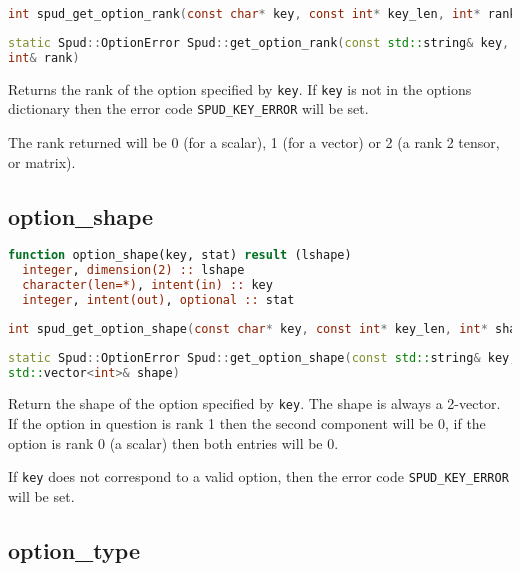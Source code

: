 \documentclass[a4paper, 11pt]{book}
\begin{document}
\begin{lstlisting}[language=C]
int spud_get_option_rank(const char* key, const int* key_len, int* rank)
\end{lstlisting}

\begin{lstlisting}[language=C++]
static Spud::OptionError Spud::get_option_rank(const std::string& key, 
int& rank)
\end{lstlisting}

Returns the rank of the option specified by \lstinline+key+. If
\lstinline+key+ is not in the options dictionary then the error code
\lstinline+SPUD_KEY_ERROR+ will be set.

The rank returned will be 0 (for a scalar), 1 (for a vector) or 2 (a rank 2
tensor, or matrix). 

\subsection{option\_shape}

\begin{lstlisting}[language=fortran]
function option_shape(key, stat) result (lshape)
  integer, dimension(2) :: lshape
  character(len=*), intent(in) :: key
  integer, intent(out), optional :: stat
\end{lstlisting}

\begin{lstlisting}[language=C]
int spud_get_option_shape(const char* key, const int* key_len, int* shape)
\end{lstlisting}

\begin{lstlisting}[language=C++]
static Spud::OptionError Spud::get_option_shape(const std::string& key, 
std::vector<int>& shape)
\end{lstlisting}

Return the shape of the option specified by \lstinline+key+. The shape is
always a 2-vector. If the option in question is rank 1 then the second
component will be 0, if the option is rank 0 (a scalar) then both entries
will be 0.

If \lstinline+key+ does not correspond to a valid option, then the error
code \lstinline+SPUD_KEY_ERROR+ will be set.

\subsection{option\_type}\label{sec:option_type}
\end{document}
